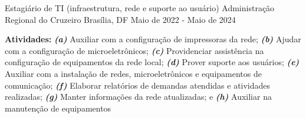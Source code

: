 

\begin{cventries}

  \cventry
    {Estagiário de TI (infraestrutura, rede e suporte ao usuário)} %
    {Administração Regional do Cruzeiro} %
    {Brasília, DF} %
    {Maio de 2022 - Maio de 2024} %
    {
      \begin{cvitems} %
        \item{\textbf{Atividades:}} \textit{\textbf{(a)}} Auxiliar com a configuração de impressoras da rede; \textit{\textbf{(b)}} Ajudar com a configuração de microeletrônicos; \textit{\textbf{(c)}} Providenciar assistência na configuração de equipamentos da rede local; \textit{\textbf{(d)}} Prover suporte aos usuários; \textit{\textbf{(e)}} Auxiliar com a instalação de redes, microeletrônicos e equipamentos de comunicação; \textit{\textbf{(f)}} Elaborar relatórios de demandas atendidas e atividades realizadas; \textit{\textbf{(g)}} Manter informações da rede atualizadas; e \textit{\textbf{(h)}} Auxiliar na manutenção de equipamentos
      \end{cvitems}
    }

\end{cventries}
